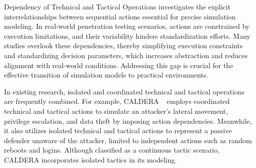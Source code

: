 
Dependency of Technical and Tactical Operations investigates the explicit interrelationships between sequential actions essential for precise simulation modeling. 
In real-world penetration testing scenarios, actions are constrained by execution limitations, and their variability hinders standardization efforts.
Many studies overlook these dependencies, thereby simplifying execution constraints and standardizing decision parameters, which increases abstraction and reduces alignment with real-world conditions. Addressing this gap is crucial for the effective transition of simulation models to practical environments.

In existing research, isolated and coordinated technical and tactical operations are frequently combined. For example, CALDERA ~\cite{applebaum2016intelligent} employs coordinated technical and tactical actions to simulate an attacker’s lateral movement, privilege escalation, and data theft by imposing action dependencies. Meanwhile, it also utilizes isolated technical and tactical actions to represent a passive defender unaware of the attacker, limited to independent actions such as random reboots and logins. Although classified as a continuous tactic scenario, CALDERA incorporates isolated tactics in its modeling.

 
